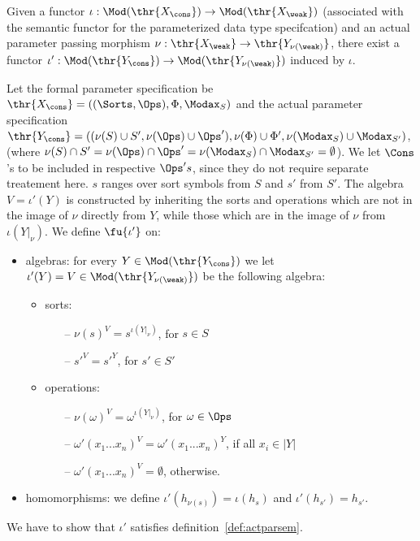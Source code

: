 \begin{proposition}\label{prop:inducedapp}
Given a functor $\iota: \Mod(\thr{X_\cons}) \to
\Mod(\thr{X_{\weak}})$ (associated with the semantic functor for the
parameterized data type specifcation) and an actual parameter passing morphism
$\nu:\thr{X_\weak} \to \thr{Y_{\nu(\weak)}}$, there exist a
functor $\iota': \Mod(\thr{Y_\cons}) \to \Mod(\thr{Y_{\nu(\weak)}})$ induced by
$\iota$.
\end{proposition}
%
\begin{PROOF}
Let the formal parameter specification be $\thr{X_\cons}=
((\Sorts,\Ops),\Phi,\Modax_S)$ and the actual parameter specification $\thr{Y_\cons}=
((\nu(S)\cup S', \nu(\Ops)\cup \Ops'), \nu(\Phi)\cup 
\Phi',\nu(\Modax_S)\cup \Modax_{S'})$, (where $\nu(S) \cap S' = \nu(\Ops)
\cap \Ops' = \nu(\Modax_S) \cap \Modax_{S'} = \emptyset$). We let $\Cons$'s to
be included in respective $\Ops's$, since they do not require separate
treatement here. $s$ ranges over sort symbols from $S$ and $s'$ from
$S'$. The algebra $V=\iota'(Y)$ is constructed by inheriting the sorts and
operations which are not in the image of $\nu$ directly from $Y$, while those
which are in the image of $\nu$ from $\iota(Y|_\nu)$. 
We define
$\fu{\iota'}$ on:
\begin{itemize}\MyLPar
\item algebras:
	for every $Y\in\Mod(\thr{Y_\cons})$ we let
	$\iota'(Y)=V\in\Mod(\thr{Y_{\nu(\weak)}})$ be the following algebra:
	\begin{itemize}\MyLPar
	\item sorts:
		\begin{itemize}
		\item[--] $\nu(s)^{V}= s^{\iota(Y|_{\nu})}$, for $s \in S$
		\item[--] ${s'}^{V}= {s'}^{Y}$, for $s' \in S'$
		\end{itemize}
	\item operations:
		\begin{itemize}
		\item[--] $\nu(\omega)^{V}= \omega^{\iota(Y|_{\nu})}$, for $\omega \in \Ops$
		\item[--] $\omega'(x_1...x_n)^{V}= \omega'(x_1...x_n)^{Y}$, if all $x_i \in |Y|$
		\item[--] $\omega'(x_1...x_n)^{V}= \emptyset$, otherwise.
		\end{itemize}
	\end{itemize}
\item homomorphisms: we define $\iota'(h_{\nu(s)}) = \iota(h_s)$ and $\iota'(h_{s'}) = h_{s'}$.
\end{itemize}
%
We have to show that $\iota'$ satisfies definition~\ref{def:actparsem}.


\end{PROOF}
